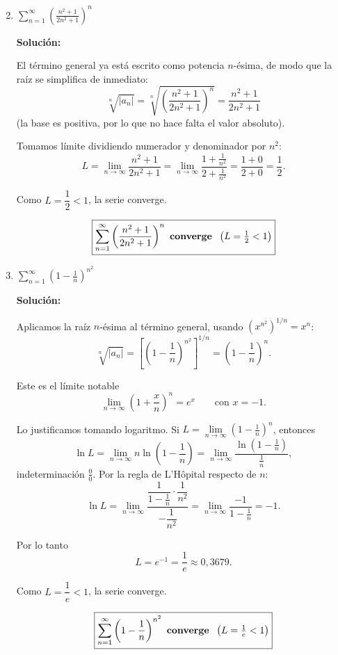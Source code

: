 \documentclass[12pt]{article}
\newcommand{\solucion}{%
    \vspace{0.8em}%
    \textbf{Solución:}%
}
\begin{document}
\begin{enumerate}[label=\alph*.-]

    \setcounter{enumi}{1} %

    \item $\displaystyle\sum_{n=1}^{\infty}
    \left(\frac{n^{2}+1}{2n^{2}+1}\right)^{n}$

    \solucion

    El término general ya está escrito como potencia $n$-ésima, de modo que la
    raíz se simplifica de inmediato:
    \[
    \sqrt[n]{|a_n|}
    =\sqrt[n]{\left(\frac{n^{2}+1}{2n^{2}+1}\right)^{n}}
    =\frac{n^{2}+1}{2n^{2}+1}
    \]
    (la base es positiva, por lo que no hace falta el valor absoluto).

    Tomamos límite dividiendo numerador y denominador por $n^{2}$:
    \[
    L=\lim_{n\to\infty}\frac{n^{2}+1}{2n^{2}+1}
    =\lim_{n\to\infty}\frac{1+\frac{1}{n^{2}}}{2+\frac{1}{n^{2}}}
    =\frac{1+0}{2+0}=\frac12 .
    \]

    Como $L=\dfrac12<1$, la serie converge.

    \[
    \boxed{
    \sum_{n=1}^{\infty}\left(\frac{n^{2}+1}{2n^{2}+1}\right)^{n}
    \text{ \textbf{converge} }\;\left(L=\tfrac12<1\right)
    }
    \]

    \item $\displaystyle\sum_{n=1}^{\infty}\left(1-\frac1n\right)^{n^{2}}$

    \solucion

    Aplicamos la raíz $n$-ésima al término general, usando
    $\left(x^{n^{2}}\right)^{1/n}=x^{n}$:
    \[
    \sqrt[n]{|a_n|}
    =\left[\left(1-\frac1n\right)^{n^{2}}\right]^{1/n}
    =\left(1-\frac1n\right)^{n}.
    \]

    Este es el límite notable
    \[
    \lim_{n\to\infty}\left(1+\frac{x}{n}\right)^{n}=e^{x}
    \qquad\text{con } x=-1 .
    \]

    Lo justificamos tomando logaritmo. Si
    $L=\lim\limits_{n\to\infty}\left(1-\frac1n\right)^{n}$, entonces
    \[
    \ln L
    =\lim_{n\to\infty} n\ln\left(1-\frac1n\right)
    =\lim_{n\to\infty}\frac{\ln\left(1-\frac1n\right)}{\frac1n},
    \]
    indeterminación $\frac00$. Por la regla de L'Hôpital respecto de $n$:
    \[
    \ln L
    =\lim_{n\to\infty}
    \frac{\dfrac{1}{1-\frac1n}\cdot\dfrac{1}{n^{2}}}
         {-\dfrac{1}{n^{2}}}
    =\lim_{n\to\infty}\frac{-1}{1-\frac1n}
    =-1 .
    \]

    Por lo tanto
    \[
    L=e^{-1}=\frac1e\approx 0{,}3679 .
    \]

    Como $L=\dfrac1e<1$, la serie converge.

    \[
    \boxed{
    \sum_{n=1}^{\infty}\left(1-\frac1n\right)^{n^{2}}
    \text{ \textbf{converge} }\;\left(L=\tfrac1e<1\right)
    }
    \]

\end{enumerate}
\end{document}
